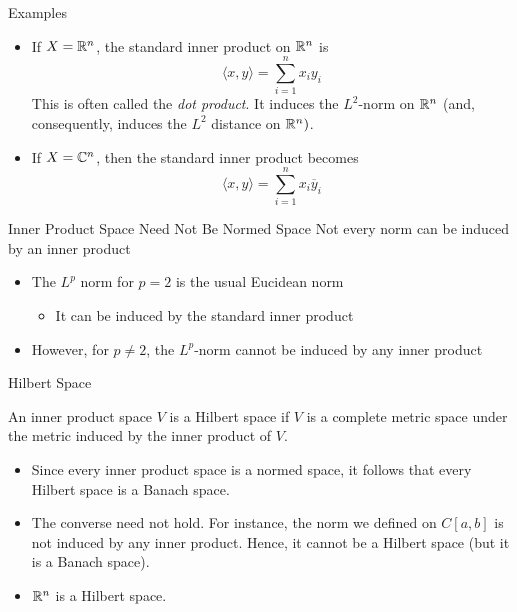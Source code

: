 \documentclass[10pt]{beamer}
\begin{document}
		\begin{frame}{Examples}
				\begin{itemize}
						\item<1-> If $X = \mathbb{R}^n$, the standard inner product on $\mathbb{R}^n$ is 
								\begin{equation*}
										\langle x, y \rangle = \sum_{i=1}^{n} x_iy_i
								\end{equation*}
								This is often called the \emph{dot product}. It induces the $L^2$-norm on $\mathbb{R}^n$ (and, consequently, induces the $L^2$ distance on $\mathbb{R}^n)$. 

						\item<2-> If $X = \mathbb{C}^n$, then the standard inner product becomes 
								\begin{equation*}
										\langle x, y \rangle = \sum_{i=1}^{n} x_i \overline{y}_i
								\end{equation*}
				\end{itemize}	
		\end{frame}

		\begin{frame}{Inner Product Space Need Not Be Normed Space}
				Not every norm can be induced by an inner product 
				\begin{itemize}
						\item The $L^p$ norm for $p = 2$ is the usual Eucidean norm
								\begin{itemize}
										\item It can be induced by the standard inner product 
								\end{itemize}
						\item However, for $p \neq 2$, the $L^p$-norm cannot be induced by any inner product
				\end{itemize}
		\end{frame}

		\begin{frame}{Hilbert Space}
				\begin{definition}
						An inner product space $V$ is a \alert{Hilbert space} if $V$ is a complete metric space under the metric induced by the inner product of $V$. 
				\end{definition}
				\begin{itemize}
						\item Since every inner product space is a normed space, it follows that every Hilbert space is a Banach space. 
						\item The converse need not hold. For instance, the norm we defined on $C[a,b]$ is not induced by any inner product. Hence, it cannot be a Hilbert space (but it is a Banach space).
						\item $\mathbb{R}^n$ is a Hilbert space. 
				\end{itemize}
		\end{frame}
\end{document}
